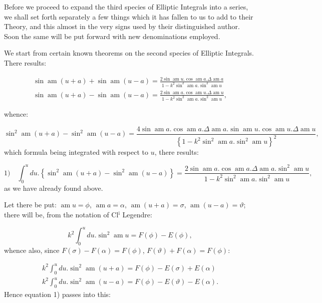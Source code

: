 \documentclass{article}
\begin{document}
Before we proceed to expand the third species of Elliptic Integrals into a series, we shall set forth separately a few things which it has fallen to us to add to their Theory, and this almost in the very signs used by their distinguished author. Soon the same will be put forward with new denominations employed.

We start from certain known theorems on the second species of Elliptic Integrals. There results:

\[
\begin{gathered}
\sin\operatorname{am}(u+a)+\sin\operatorname{am}(u-a)=\frac{2\sin\operatorname{am}u.\cos\operatorname{am}a.\Delta\operatorname{am}a}{1-k^{2}\sin^{2}\operatorname{am}a.\sin^{2}\operatorname{am}u}\\[1.5ex]
\sin\operatorname{am}(u+a)-\sin\operatorname{am}(u-a)=\frac{2\sin\operatorname{am}a.\cos\operatorname{am}u.\Delta\operatorname{am}u}{1-k^{2}\sin^{2}\operatorname{am}a.\sin^{2}\operatorname{am}u},
\end{gathered}
\]

whence:

\[
\sin^{2}\operatorname{am}(u+a)-\sin^{2}\operatorname{am}(u-a)=\frac{4\sin\operatorname{am}a.\cos\operatorname{am}a.\Delta\operatorname{am}a.\sin\operatorname{am}u.\cos\operatorname{am}u.\Delta\operatorname{am}u}{\left\{1-k^{2}\sin^{2}\operatorname{am}a.\sin^{2}\operatorname{am}u\right\}^{2}},
\]
which formula being integrated with respect to $u$, there results:

\[
\text{1)}\quad\int_{0}^{u}du.\left\{\sin^{2}\operatorname{am}(u+a)-\sin^{2}\operatorname{am}(u-a)\right\}=\frac{2\sin\operatorname{am}a.\cos\operatorname{am}a.\Delta\operatorname{am}a.\sin^{2}\operatorname{am}u}{1-k^{2}\sin^{2}\operatorname{am}a.\sin^{2}\operatorname{am}u},
\]
as we have already found above.

Let there be put: $\operatorname{am}u=\phi$, $\operatorname{am}a=\alpha$, $\operatorname{am}(u+a)=\sigma$, $\operatorname{am}(u-a)=\vartheta$; there will be, from the notation of Cl$^{\mathrm{i}}$ Legendre:

\[
k^{2}\int_{0}^{u}du.\sin^{2}\operatorname{am}u=F(\phi)-E(\phi),
\]
whence also, since $F(\sigma)-F(\alpha)=F(\phi)$, $F(\vartheta)+F(\alpha)=F(\phi)$:

\[
\begin{gathered}
k^{2}\int_{0}^{u}du.\sin^{2}\operatorname{am}(u+a)=F(\phi)-E(\sigma)+E(\alpha)\\[1.5ex]
k^{2}\int_{0}^{u}du.\sin^{2}\operatorname{am}(u-a)=F(\phi)-E(\vartheta)-E(\alpha).
\end{gathered}
\]
Hence equation 1) passes into this:
\end{document}
